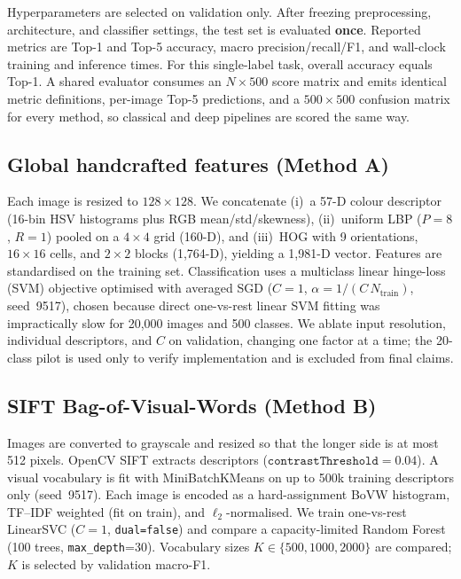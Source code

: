 \documentclass[10pt,twocolumn,letterpaper]{article}
\begin{document}
Hyperparameters are selected on validation only. After freezing
preprocessing, architecture, and classifier settings, the test set is
evaluated \textbf{once}. Reported metrics are Top-1 and Top-5 accuracy, macro
precision/recall/F1, and wall-clock training and inference times. For this
single-label task, overall accuracy equals Top-1. A shared evaluator consumes
an $N\times500$ score matrix and emits identical metric definitions, per-image
Top-5 predictions, and a $500\times500$ confusion matrix for every method,
so classical and deep pipelines are scored the same way.

\subsection{Global handcrafted features (Method A)}
\label{sec:method-a}

Each image is resized to $128\times128$. We concatenate (i)~a 57-D colour
descriptor (16-bin HSV histograms plus RGB mean/std/skewness), (ii)~uniform
LBP ($P{=}8$, $R{=}1$) pooled on a $4\times4$ grid (160-D), and (iii)~HOG with
9 orientations, $16\times16$ cells, and $2\times2$ blocks (1{,}764-D), yielding
a 1{,}981-D vector. Features are standardised on the training set.
Classification uses a multiclass linear hinge-loss (SVM) objective optimised
with averaged SGD ($C{=}1$, $\alpha = 1/(C\,N_{\mathrm{train}})$, seed~9517),
chosen because direct one-vs-rest linear SVM fitting was impractically slow for
20{,}000 images and 500 classes. We ablate input resolution, individual
descriptors, and $C$ on validation, changing one factor at a time; the 20-class
pilot is used only to verify implementation and is excluded from final claims.

\subsection{SIFT Bag-of-Visual-Words (Method B)}
\label{sec:method-b}

Images are converted to grayscale and resized so that the longer side is at
most 512 pixels. OpenCV SIFT extracts descriptors
($\texttt{contrastThreshold}{=}0.04$). A visual vocabulary is fit with
MiniBatchKMeans on up to 500k training descriptors only (seed~9517). Each
image is encoded as a hard-assignment BoVW histogram, TF--IDF weighted (fit on
train), and $\ell_2$-normalised. We train one-vs-rest LinearSVC ($C{=}1$,
\texttt{dual=false}) and compare a capacity-limited Random Forest (100 trees,
\texttt{max\_depth}{=}30). Vocabulary sizes $K\in\{500,1000,2000\}$ are
compared; $K$ is selected by validation macro-F1.
\end{document}
